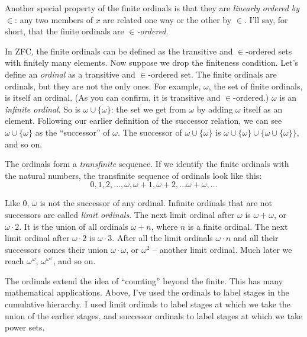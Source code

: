 Another special property of the finite ordinals is that
they are \emph{linearly ordered by $\in$}:
any two members of $x$ are related one way or the other by $\in$.
I'll say, for short,
that the finite ordinals are \emph{$\in$-ordered}.

In ZFC,
the finite ordinals can be defined as
the transitive and $\in$-ordered sets with finitely many elements.
Now suppose we drop the finiteness condition.
Let's define an \emph{ordinal} as a transitive and $\in$-ordered set.
The finite ordinals are ordinals,
but they are not the only ones.
For example,
$\omega$, the set of finite ordinals, is itself an ordinal.
(As you can confirm,
it is transitive and $\in$-ordered.)
$\omega$ is an \emph{infinite ordinal}.
So is $\omega \cup \{ \omega \}$:
the set we get from $\omega$ by adding $\omega$ itself as an element.
Following our earlier definition of the successor relation,
we can see $\omega \cup \{ \omega \}$ as the ``successor'' of $\omega$.
The successor of $\omega \cup \{ \omega \}$ is $\omega \cup \{ \omega \} \cup \{ \omega \cup \{ \omega \} \}$,
and so on.

The ordinals form a \emph{transfinite} sequence.
If we identify the finite ordinals with the natural numbers,
the transfinite sequence of ordinals look like this:
\[
  0, 1, 2, \ldots, \omega, \omega\!+\!1, \omega\!+\!2, \ldots \omega\!+\!\omega, \ldots
\]

Like 0, $\omega$ is not the successor of any ordinal.
Infinite ordinals that are not successors are called \textit{limit ordinals}.
The next limit ordinal after $\omega$ is $\omega\!+\!\omega$,
or $\omega \cdot 2$.
It is the union of all ordinals $\omega\!+\!n$,
where $n$ is a finite ordinal.
The next limit ordinal after $\omega \cdot 2$ is $\omega \cdot 3$.
After all the limit ordinals $\omega \cdot n$
and all their successors
comes their union $\omega \cdot \omega$,
or $\omega^{2}$
-- another limit ordinal.
Much later we reach $\omega^{\omega}$, $\omega^{\omega^{\omega}}$, and so on.

The ordinals extend the idea of ``counting'' beyond the finite.
This has many mathematical applications.
Above,
I've used the ordinals to label stages in the cumulative hierarchy.
I used limit ordinals to label stages at which we take the union of the earlier stages,
and successor ordinals to label stages at which we take power sets.


